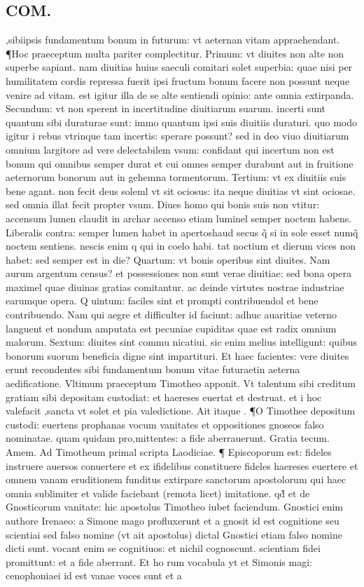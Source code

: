 \documentclass{article}
\begin{document}
\begin{pages}
\section*{COM. }
\marginpar{[ p.6 ]}\pstart ,sibiipsis fundamentum bonum in futurum: vt aeternan vitam appraehendant. ¶Hoc praeceptum multa pariter complectitur. Primum: vt diuites non alte non superbe sapiant. nam diuitias huius saeculi comitari solet superbia: quae nisi per humilitatem cordis repressa fuerit ipsi fructum bonum facere non possunt neque venire ad vitam. est igitur illa de se alte sentiendi opinio: ante omnia extirpanda. Secundum: vt non sperent in incertitudine diuitiarum suarum. incerti sunt quantum sibi duraturae sunt: immo quantum ipsi suis diuitiis duraturi. quo modo igitur i rebus vtrinque tam incertis: sperare possunt? sed in deo viuo diuitiarum omnium largitore ad vere delectabilem vsum: confidant qui incertum non est bonum qui omnibus semper durat et cui omnes semper durabunt aut in fruitione aeternorum bonorum aut in gehemna tormentorum. Tertium: vt ex diuitiis suis bene agant. non fecit deus soleml vt sit ociosus: ita neque diuitias vt sint ociosae. sed omnia illat fecit propter vsum. Diues homo qui bonis suis non vtitur: accensum lumen claudit in archar accenso etiam luminel semper noctem habens. Liberalis contra: semper lumen habet in apertoshaud secus q̃ si in sole esset numq̃ noctem sentiens. nescis enim q qui in coelo habi. tat noctium et dierum vices non habet: sed semper est in die? Quartum: vt bonis operibus sint diuites. Nam aurum argentum census? et possessiones non sunt verae diuitiae: sed bona opera maximel quae diuinas gratias comitantur. ac deinde virtutes nostrae industriae earumque opera. Q uintum: faciles sint et prompti contribuendol et bene contribuendo. Nam qui aegre et difficulter id faciunt: adhuc auaritiae veterno languent et nondum amputata est pecuniae cupiditas quae est radix omnium malorum. Sextum: diuites sint commu nicatiui. sic enim melius intelligunt: quibus bonorum suorum beneficia digne sint impartituri. Et haec facientes: vere diuites erunt recondentes sibi fundamentum bonum vitae futuraetin aeterna aedificatione. Vltimum praeceptum Timotheo apponit. Vt talentum sibi creditum gratiam sibi depositam custodiat: et haereses euertat et destruat. et i hoc valefacit ,sancta vt solet et pia valedictione. Ait itaque . ¶O Timothee depositum custodi: euertens  prophanas vocum vanitates et oppositiones gnoseos falso nominatae. quam quidam pro,mittentes: a fide aberrauerunt. Gratia tecum. Amem. Ad Timotheum primal scripta Laodiciae. ¶ Episcoporum est: fideles instruere auersos conuertere et ex ifidelibus constituere fideles  haereses euertere et omnem vanam eruditionem funditus extirpare sanctorum apostolorum qui haec omnia sublimiter et valide faciebant (remota licet) imitatione. qd̃ et de Gnosticorum vanitate: hic apostolus Timotheo iubet faciendum. Gnostici enim authore Irenaeo: a Simone mago profluxerunt et a gnosit id est cognitione seu scientiai sed falso nomine (vt ait apostolus) dictal Gnostici etiam falso nomine dicti sunt. vocant enim se cognitiuos: et nichil cognoscunt. scientiam fidei promittunt: et a fide aberrant. Et ho rum vocabula yt et Simonis magi: cenophoniaei id est vanae voces sunt et a 
\end{pages}
\end{document}
